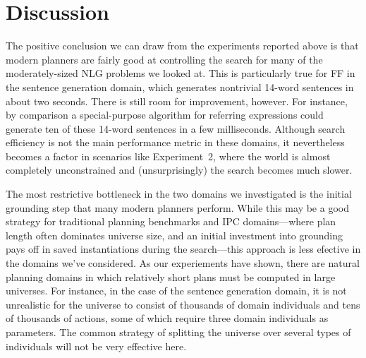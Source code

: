 \section{Discussion} \label{sec:discussion}

The positive conclusion we can draw from the experiments reported above is
that modern planners are fairly good at controlling the search for many of
the moderately-sized NLG problems we looked at. This is particularly true
for FF in the sentence generation domain, which generates nontrivial
14-word sentences in about two seconds. There is still room for
improvement, however. For instance, by comparison a special-purpose
algorithm for referring expressions could generate ten of these 14-word
sentences in a few milliseconds. Although search efficiency is not the main
performance metric in these domains, it nevertheless becomes a factor in
scenarios like Experiment~2, where the world is almost completely
unconstrained and (unsurprisingly) the search becomes much slower.


The most restrictive bottleneck in the two domains we investigated is the
initial grounding step that many modern planners perform. While this may be
a good strategy for traditional planning benchmarks and IPC domains---where
plan length often dominates universe size, and an initial investment into
grounding pays off in saved instantiations during the search---this
approach is less efective in the domains we've considered. As our
experiements have shown, there are natural planning domains in which
relatively short plans must be computed in large universes. For instance,
in the case of the sentence generation domain, it is not unrealistic for
the universe to consist of thousands of domain individuals and tens of
thousands of actions, some of which require three domain individuals as
parameters. The common strategy of splitting the universe over several
types of individuals will not be very effective here.

